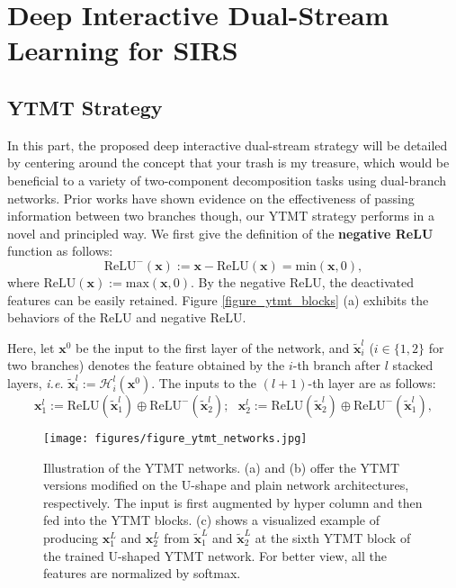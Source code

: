 \documentclass{article}
\begin{document}
\section{Deep Interactive Dual-Stream Learning for SIRS}
\subsection{YTMT Strategy}
In this part, the proposed deep interactive dual-stream strategy will be detailed by centering around the concept that your trash is my treasure, which would be beneficial to a variety of two-component decomposition tasks using dual-branch networks. Prior works \cite{li2019single, DBLP:conf/cvpr/WanSDTK18} have shown evidence on the effectiveness of passing information between two branches though, our YTMT strategy performs in a novel and principled way. We first give the definition of the \textbf{negative ReLU} function as follows:
\begin{equation}
\mathrm{ReLU}^{-}(\mathbf{x}) := \mathbf{x} - \mathrm{ReLU}(\mathbf{x}) = \mathrm{min}(\mathbf{x},0),
\end{equation}
where $\mathrm{ReLU}(\mathbf{x}) := \mathrm{max}(\mathbf{x},0)$. By the negative ReLU, the deactivated features can be easily retained. Figure \ref{figure_ytmt_blocks} (a) exhibits the behaviors of the ReLU and negative ReLU. 


Here, let $\mathbf{x}^0$ be the input to the first layer of the network, and $\mathbf{\tilde{x}}_i^l$ ($i\in\{1,2\}$ for two branches) denotes the feature obtained by the $i$-th branch after $l$ stacked layers, \emph{i.e.} $\mathbf{\tilde{x}}_i^l:=\mathcal{H}_i^l(\mathbf{x}^0)$. The inputs to the $(l+1)$-th layer are as follows:
\begin{equation}
\mathbf{x}_1^l := \mathrm{ReLU}(\mathbf{\tilde{x}}_1^l)\oplus \mathrm{ReLU}^{-}(\mathbf{\tilde{x}}_2^l); \ \ \  \mathbf{x}_2^l := \mathrm{ReLU}(\mathbf{\tilde{x}}_2^l)\oplus \mathrm{ReLU}^{-}(\mathbf{\tilde{x}}_1^l),
\label{eq:feature}
\end{equation}

\begin{figure}[t]
	\centering
	\texttt{[image: figures/figure\_ytmt\_networks.jpg]}
	\caption{Illustration of the YTMT networks. (a) and (b) offer the YTMT versions modified on the U-shape and plain network architectures, respectively. The input is first augmented by hyper column \cite{DBLP:conf/cvpr/ZhangNC18a} and then fed into the YTMT blocks. (c) shows a visualized example of producing $\mathbf{{x}}_1^L$ and $\mathbf{{x}}_2^L$ from $\mathbf{\tilde{x}}_1^L$ and $\mathbf{\tilde{x}}_2^L$ at the sixth YTMT block of the trained U-shaped YTMT network. For better view, all the features are normalized by softmax.}
	\label{arch}
\end{figure}
\end{document}
